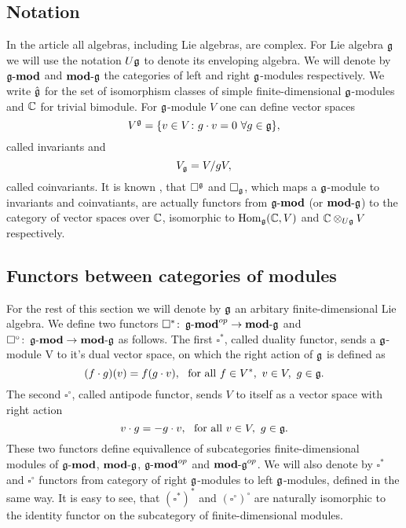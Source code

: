 % 

\subsection{Notation} 
In the article all algebras, including Lie algebras, are complex.  For Lie algebra $\mathfrak{g}$ we will
use the notation $U\mathfrak{g}$ to denote its enveloping algebra. We will denote by $\operatorname{\mathbf{\mathfrak{g}-mod}}$ and
$\operatorname{\mathbf{mod-\mathfrak{g}}}$ the categories of left and right $\mathfrak{g}$-modules respectively.  We write $\hat{\mathfrak{g}}$
for the set of isomorphism classes of simple finite-dimensional $\mathfrak{g}$-modules and $\mathbb{C}$
for trivial bimodule.  For $\mathfrak{g}$-module $V$ one can define vector spaces 
\begin{equation}
    V^{\mathfrak{g}} = \{v\in V\colon g\cdot v = 0 ~ \forall g\in \mathfrak{g} \}, 
\end{equation}
called invariants and
\begin{equation}
    V_{\mathfrak{g}} = V/gV,
\end{equation}
called coinvariants. It is known \cite{weibel}, that $\square^{\mathfrak{g}}$ and $\square_{\mathfrak{g}}$, which
maps a $\mathfrak{g}$-module to invariants and coinvatiants, are actually functors from $\operatorname{\mathbf{\mathfrak{g}-mod}}$ (or
$\operatorname{\mathbf{mod-\mathfrak{g}}}$) to the category of vector spaces over $\mathbb{C}$, isomorphic to $\operatorname{Hom}_{\mathfrak{g}}(\mathbb{C}, V)$ and
$\mathbb{C} \otimes_{U\mathfrak{g}} V$ respectively. 

\subsection{Functors between categories of modules}
For the rest of this section we will denote by $\mathfrak{g}$ an arbitary finite-dimensional Lie algebra.
We define two functors $\square^*\colon \operatorname{\mathbf{\mathfrak{g}-mod}}^{op} \to \operatorname{\mathbf{mod-\mathfrak{g}}}$ and
$\square^\circ\colon \operatorname{\mathbf{\mathfrak{g}-mod}} \to \operatorname{\mathbf{mod-\mathfrak{g}}}$ as follows. The first $\square^*$, called
duality functor, sends a $\mathfrak{g}$-module V to it's dual vector space, on which the right action of
$\mathfrak{g}$ is defined as 
\[
    (f\cdot g) (v) = f(g\cdot v),~\text{ for all } f\in V^*,~v \in V,~g\in\mathfrak{g}.
\]
The second $\square^\circ$, called antipode functor, sends $V$ to itself as a vector space with right
action
\[
    v\cdot g = - g\cdot v,~\text{ for all } v \in V,~g\in\mathfrak{g}.
\]
These two functors define equivallence of subcategories finite-dimensional modules of $\operatorname{\mathbf{\mathfrak{g}-mod}}$,
$\operatorname{\mathbf{mod-\mathfrak{g}}}$, $\operatorname{\mathbf{\mathfrak{g}-mod}}^{op}$ and $\operatorname{\mathbf{mod-\mathfrak{g}}}^{op}$. We will also denote by $\square^*$ and
$\square^\circ$ functors from category of right $\mathfrak{g}$-modules to left $\mathfrak{g}$-modules, defined in
the same way. It is easy to see, that $(\square^*)^*$ and $(\square^\circ)^\circ$ are naturally
isomorphic to the identity functor on the subcategory of finite-dimensional modules.


